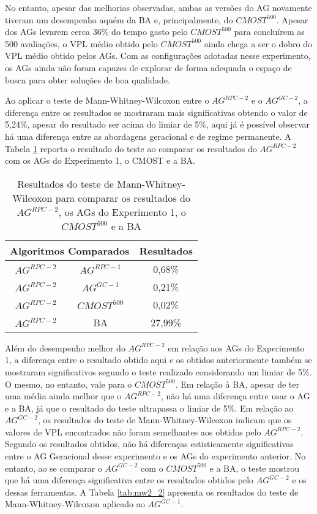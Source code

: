 No entanto, apesar das melhorias observadas, ambas as versões do AG novamente tiveram um desempenho aquém da BA e, principalmente, do $CMOST^{500}$. Apesar dos AGs levarem cerca 36\% do tempo gasto pelo $CMOST^{500}$ para concluírem as 500 avaliações, o VPL médio obtido pelo $CMOST^{500}$ ainda chega a ser o dobro do VPL médio obtido pelos AGs. Com as configurações adotadas nesse experimento, os AGs ainda não foram capazes de explorar de forma adequada o espaço de busca para obter soluções de boa qualidade. 

Ao aplicar o teste de Mann-Whitney-Wilcoxon entre o $AG^{RPC-2}$ e o $AG^{GC-2}$, a diferença entre os resultados se mostraram mais significativas obtendo o valor de 5,24\%, apesar do resultado ser acima do limiar de 5\%, aqui já é possível observar há uma diferença entre as abordagens geracional e de regime permanente. A Tabela \ref{tab:mw2_1} reporta o resultado do teste ao comparar os resultados do $AG^{RPC-2}$ com os AGs do Experimento 1, o CMOST e a BA. 

\begin{table}[H]
\centering
\caption{Resultados do teste de Mann-Whitney-Wilcoxon para comparar os resultados do $AG^{RPC-2}$, os AGs do Experimento 1, o $CMOST^{500}$ e a BA}
\label{tab:mw2_1}
\begin{tabular}{|c|c|c|}
\hline
\multicolumn{2}{|c|}{Algoritmos Comparados} & Resultados \\ \hline
$AG^{RPC-2}$ & $AG^{RPC-1}$ & 0,68\% \\ \hline
$AG^{RPC-2}$ & $AG^{GC-1}$ & 0,21\% \\ \hline
$AG^{RPC-2}$ & $CMOST^{500}$ & 0,02\% \\ \hline
$AG^{RPC-2}$ & BA & 27,99\% \\ \hline
\end{tabular}
\end{table}

Além do desempenho melhor do $AG^{RPC-2}$ em relação aos AGs do Experimento 1, a diferença entre o resultado obtido aqui e os obtidos anteriormente também se mostraram significativos segundo o teste realizado considerando um limiar de 5\%. O mesmo, no entanto, vale para o $CMOST^{500}$. Em relação à BA, apesar de ter uma média ainda melhor que o $AG^{RPC-2}$, não há uma diferença entre usar o AG e a BA, já que o resultado do teste ultrapassa o limiar de 5\%. Em relação ao $AG^{GC-2}$, os resultados do teste de Mann-Whitney-Wilcoxon indicam que os valores de VPL encontrados não foram semelhantes aos obtidos pelo $AG^{RPC-2}$. Segundo os resultados obtidos, não há diferenças estisticamente significativas entre o AG Geracional desse experimento e os AGs do experimento anterior. No entanto, ao se comparar o $AG^{GC-2}$ com o $CMOST^{500}$ e a BA, o teste mostrou que há uma diferença significativa entre os resultados obtidos pelo $AG^{GC-2}$ e os dessas ferramentas. A Tabela \ref{tab:mw2_2} apresenta os resultados do teste de Mann-Whitney-Wilcoxon aplicado ao $AG^{GC-1}$.


